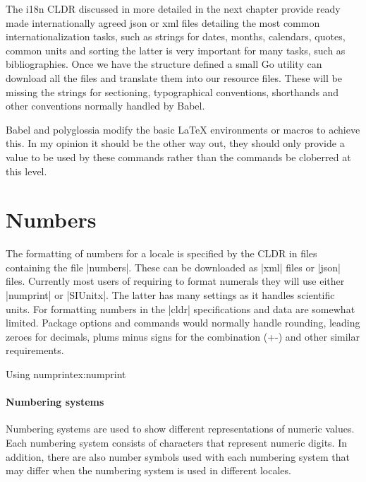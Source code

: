 The i18n CLDR discussed in more detailed in the next chapter provide ready made internationally agreed json or xml files
detailing the most common internationalization tasks, such as strings for dates, months, calendars, quotes, common units and
sorting the latter is very important for many tasks, such as bibliographies. Once we have the structure defined
a small Go utility can download all the files and translate them into our resource files. These will be missing the
strings for sectioning, typographical conventions, shorthands and other conventions normally handled by Babel. 

Babel and polyglossia modify the basic LaTeX environments or macros to achieve this. In my opinion it should be the other way out, they should only provide a value to be used by these commands rather than the commands be cloberred at this level.

\section{Numbers}

The formatting of numbers for a locale is specified by the CLDR in files containing the file |numbers|. These can be downloaded as |xml| files or |json| files.
Currently most users of \latexe requiring to format numerals they will use either |numprint| or |SIUnitx|. The latter has many settings as it handles scientific units. For formatting numbers in \latexe the |cldr| specifications and data are somewhat limited. Package options and commands
would normally handle rounding, leading zeroes for decimals, plums minus signs for the combination (+-) and other similar requirements.



\begin{texexample}{Using numprint}{ex:numprint}

\end{texexample}



\paragraph{Numbering systems}

Numbering systems are used to show different representations of numeric values. Each numbering system consists of characters that represent numeric digits. In addition, there are also number symbols used with each numbering system that may differ when the numbering system is used in different locales.


